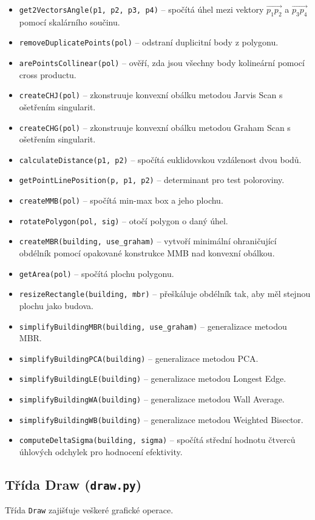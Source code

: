 \documentclass[11pt, a4paper]{article}
\begin{document}
\begin{itemize}
\item \texttt{get2VectorsAngle(p1, p2, p3, p4)} -- spočítá úhel mezi vektory $\vec{p_1p_2}$ a $\vec{p_3p_4}$ pomocí skalárního součinu.
\item \texttt{removeDuplicatePoints(pol)} -- odstraní duplicitní body z polygonu.
\item \texttt{arePointsCollinear(pol)} -- ověří, zda jsou všechny body kolineární pomocí cross productu.
\item \texttt{createCHJ(pol)} -- zkonstruuje konvexní obálku metodou Jarvis Scan s ošetřením singularit.
\item \texttt{createCHG(pol)} -- zkonstruuje konvexní obálku metodou Graham Scan s ošetřením singularit.
\item \texttt{calculateDistance(p1, p2)} -- spočítá euklidovskou vzdálenost dvou bodů.
\item \texttt{getPointLinePosition(p, p1, p2)} -- determinant pro test poloroviny.
\item \texttt{createMMB(pol)} -- spočítá min-max box a jeho plochu.
\item \texttt{rotatePolygon(pol, sig)} -- otočí polygon o daný úhel.
\item \texttt{createMBR(building, use\_graham)} -- vytvoří minimální ohraničující obdélník pomocí opakované konstrukce MMB nad konvexní obálkou.
\item \texttt{getArea(pol)} -- spočítá plochu polygonu.
\item \texttt{resizeRectangle(building, mbr)} -- přeškáluje obdélník tak, aby měl stejnou plochu jako budova.
\item \texttt{simplifyBuildingMBR(building, use\_graham)} -- generalizace metodou MBR.
\item \texttt{simplifyBuildingPCA(building)} -- generalizace metodou PCA.
\item \texttt{simplifyBuildingLE(building)} -- generalizace metodou Longest Edge.
\item \texttt{simplifyBuildingWA(building)} -- generalizace metodou Wall Average.
\item \texttt{simplifyBuildingWB(building)} -- generalizace metodou Weighted Bisector.
\item \texttt{computeDeltaSigma(building, sigma)} -- spočítá střední hodnotu čtverců úhlových odchylek pro hodnocení efektivity.
\end{itemize}

\subsection{Třída Draw (\texttt{draw.py})}
Třída \texttt{Draw} zajišťuje veškeré grafické operace.
\end{document}
